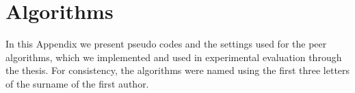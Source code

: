 \chapter{Algorithms}
\label{cha:peers}


In this Appendix we present pseudo codes and the settings used for the peer algorithms, which we implemented and used in experimental evaluation through the thesis. For consistency, the algorithms were named using the first three letters of the surname of the first author.
